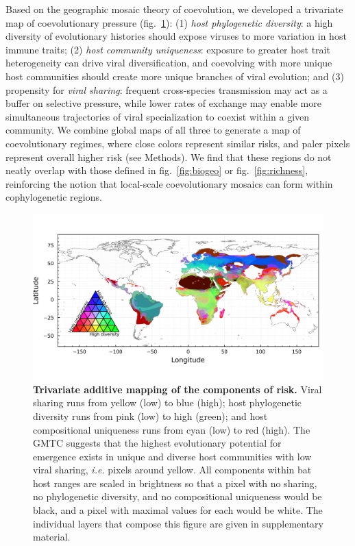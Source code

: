 \documentclass[10pt,oneside]{article}
\makeatletter
\def\maxwidth{\ifdim\Gin@nat@width>\linewidth\linewidth
\else\Gin@nat@width\fi}
\let\Oldincludegraphics\includegraphics
\renewcommand{\includegraphics}[1]{\Oldincludegraphics[width=\maxwidth]{#1}}
\makeatother
\begin{document}
Based on the geographic mosaic theory of coevolution, we developed a
trivariate map of coevolutionary pressure (fig.~\ref{fig:trivariate}):
(1) \emph{host phylogenetic diversity}: a high diversity of evolutionary
histories should expose viruses to more variation in host immune traits;
(2) \emph{host community uniqueness}: exposure to greater host trait
heterogeneity can drive viral diversification, and coevolving with more
unique host communities should create more unique branches of viral
evolution; and (3) propensity for \emph{viral sharing}: frequent
cross-species transmission may act as a buffer on selective pressure,
while lower rates of exchange may enable more simultaneous trajectories
of viral specialization to coexist within a given community. We combine
global maps of all three to generate a map of coevolutionary regimes,
where close colors represent similar risks, and paler pixels represent
overall higher risk (see Methods). We find that these regions do not
neatly overlap with those defined in fig.~\ref{fig:biogeo} or
fig.~\ref{fig:richness}, reinforcing the notion that local-scale
coevolutionary mosaics can form within cophylogenetic regions.

\begin{figure}
\hypertarget{fig:trivariate}{%
\centering
\includegraphics{figures/risk_trivariate.png}
\caption{\textbf{Trivariate additive mapping of the components of risk.}
Viral sharing runs from yellow (low) to blue (high); host phylogenetic
diversity runs from pink (low) to high (green); and host compositional
uniqueness runs from cyan (low) to red (high). The GMTC suggests that
the highest evolutionary potential for emergence exists in unique and
diverse host communities with low viral sharing, \emph{i.e.} pixels
around yellow. All components within bat host ranges are scaled in
brightness so that a pixel with no sharing, no phylogenetic diversity,
and no compositional uniqueness would be black, and a pixel with maximal
values for each would be white. The individual layers that compose this
figure are given in supplementary material.}\label{fig:trivariate}
}
\end{figure}
\end{document}
